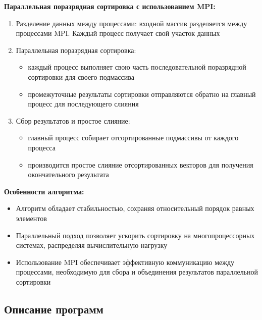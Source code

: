 \documentclass[a4paper, 14pt]{article}
\begin{document}
	
	\textbf{Параллельная поразрядная сортировка с использованием MPI:}
	\vspace{-1em}
	\begin{enumerate}[leftmargin=3em]
		\setlength\itemsep{0cm}
		\item Разделение данных между процессами: входной массив разделяется между процессами MPI. Каждый процесс получает свой участок данных
		\item Параллельная поразрядная сортировка:
		\begin{itemize}
			\setlength\itemsep{0cm}
			\item каждый процесс выполняет свою часть последовательной поразрядной сортировки для своего подмассива
			\item промежуточные результаты сортировки отправляются обратно на главный процесс для последующего слияния
		\end{itemize}
		\item Сбор результатов и простое слияние: 
		\vspace{-0.3cm}
		\begin{itemize}
			\setlength\itemsep{0cm}
			\item главный процесс собирает отсортированные подмассивы от каждого процесса
			\item производится простое слияние отсортированных векторов для получения окончательного результата
		\end{itemize}
	\end{enumerate}
	
	
	\textbf{Особенности алгоритма:}
	\vspace{-1em}
	\begin{itemize}[leftmargin=3em]
		\setlength\itemsep{0cm}
		\item Алгоритм обладает стабильностью, сохраняя относительный порядок равных элементов
		\item Параллельный подход позволяет ускорить сортировку на многопроцессорных системах, распределяя вычислительную нагрузку
		\item Использование MPI обеспечивает эффективную коммуникацию между процессами, необходимую для сбора и объединения результатов параллельной сортировки
	\end{itemize}
	\newpage
	\subsection*{\centering Описание программ}
\end{document}
